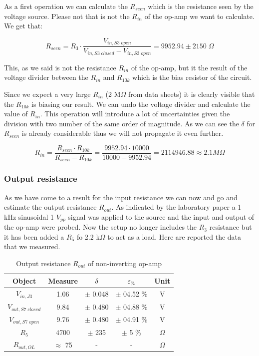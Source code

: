 \documentclass[../main.tex]{subfiles}
\begin{document}
As a first operation we can calculate the $R_{seen}$ which is the resistance seen by the voltage source. Please not that is not the $R_{in}$ of the op-amp we want to calculate.
We get that:

\begin{equation}
	R_{seen} = R_3 \cdot \frac{V_{in,S3\;open}}{V_{in,S3\;closed} - V_{in,S3\;open}} = 9952.94 \pm 2150 \; \Omega 
\end{equation}

This, as we said is not the resistance $R_{in}$ of the op-amp, but it the result of the voltage divider between the $R_{in}$ and $R_{10k}$ which is the bias resistor of the circuit.

Since we expect a very large $R_{in}$ (2 M$\Omega$ from data sheets) it is clearly visible that the $R_{10k}$ is biasing our result.
We can undo the voltage divider and calculate the value of $R_{in}$. This operation will introduce a lot of uncertainties given the division with two number of the same order of magnitude. As we can see the $\delta$ for $R_{seen}$ is already considerable thus we will not propagate it even further.

\begin{equation}
	R_{in} = \frac{R_{seen} \cdot R_{10k} }{R_{seen} - R_{10k}} = \frac{9952.94 \cdot 10000}{10000 - 9952.94} = 2114946.88 \approx 2.1 \unit{M}\Omega
\end{equation} 

\subsubsection*{Output resistance}

As we have come to a result for the input resistance we can now and go and estimate the output resistance $R_{out}$.
As indicated by the laboratory paper a 1 kHz sinusoidal 1 $V_{pp}$ signal was applied to the source and the input and output of the op-amp were probed.
Now the setup no longer includes the $R_3$ resistance but it has been added a $R_5$ fo 2.2 k$\Omega$ to act as a load.
Here are reported the data that we measured.


\begin{table}[h!]
\centering	

\begin{tabular}{ccccc}
\textbf{Object} & \textbf{Measure}   & \textbf{$\delta$} & \textbf{$\varepsilon_{\%}$} & \textbf{Unit} \\

\hline
$V_{in,J3}$  &  1.06 & $\pm$ 0.048 & $\pm$ 04.52 \% &  V \\ 
\hline
$V_{out,S7\;closed}$  &  9.84 & $\pm$ 0.480 & $\pm$ 04.88 \% &  V \\ 
\hline
$V_{out,S7\;open}$  &  9.76 & $\pm$ 0.480 & $\pm$ 04.91 \% &  V \\
\hline
$R_{5}$  &  4700 & $\pm$ 235 & $\pm$ 5 \% & $\Omega$ \\
\hline
$R_{out,OL}$  &  $\approx$ 75 &  - &  -  & $\Omega$ \\

\end{tabular}
\caption*{Output resistance $R_{out}$ of non-inverting op-amp}
\end{table}
\end{document}
